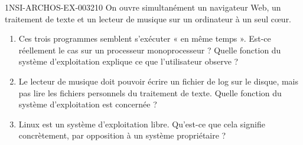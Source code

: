\begin{exercice}{1NSI-ARCHOS-EX-003}{2}{10}
On ouvre simultanément un navigateur Web, un traitement de texte et un lecteur de musique
sur un ordinateur à un seul cœur.
\begin{enumerate}
  \item Ces trois programmes semblent s'exécuter « en même temps ». Est-ce réellement le cas sur un processeur monoprocesseur ? Quelle fonction du système d'exploitation explique ce que l'utilisateur observe ?
  \item Le lecteur de musique doit pouvoir écrire un fichier de log sur le disque, mais pas lire les fichiers personnels du traitement de texte. Quelle fonction du système d'exploitation est concernée ?
  \item Linux est un système d'exploitation libre. Qu'est-ce que cela signifie concrètement, par opposition à un système propriétaire ?
\end{enumerate}
\end{exercice}
